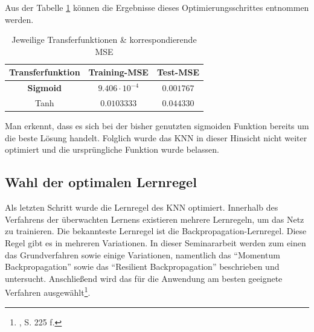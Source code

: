 Aus der Tabelle \ref{tab:TRANSMSE} können die Ergebnisse dieses Optimierungsschrittes entnommen werden.


\begin{table}[H]
  \centering
  \begin{tabular}{|c|c|c|}
  \hline 
  \rule[0ex]{0pt}{2.5ex} Transferfunktion & Training-MSE & Test-MSE \\ 
  \hline 
  \rule[0ex]{0pt}{2.5ex} \textbf{Sigmoid} & $9.406 \cdot 10^{-4}$ & $0.001767$\\ 
  \hline 
  \rule[0ex]{0pt}{2.5ex} Tanh & $0.0103333$ & $0.044330$ \\ 
  \hline 
  \end{tabular} 
  \caption{Jeweilige Transferfunktionen \& korrespondierende MSE}
  \label{tab:TRANSMSE}
\end{table}

Man erkennt, dass es sich bei der bisher genutzten sigmoiden Funktion bereits um die beste Lösung handelt. Folglich wurde das KNN in dieser Hinsicht nicht weiter optimiert und die ursprüngliche Funktion wurde belassen.

\subsection{Wahl der optimalen Lernregel}
\label{subsection:Wahl der optimalen Lernregel}

Als letzten Schritt wurde die Lernregel des KNN optimiert. Innerhalb des Verfahrens der überwachten Lernens existieren mehrere Lernregeln, um das Netz zu trainieren. Die bekannteste Lernregel ist die Backpropagation-Lernregel. Diese Regel gibt es in mehreren Variationen. In dieser Seminararbeit werden zum einen das Grundverfahren sowie einige Variationen, namentlich das  "`Momentum Backpropagation"' sowie das "`Resilient Backpropagation"' beschrieben und untersucht. Anschließend wird das für die Anwendung am besten geeignete Verfahren ausgewählt\footnote{\Vgl{}, S. 225 f.}.

